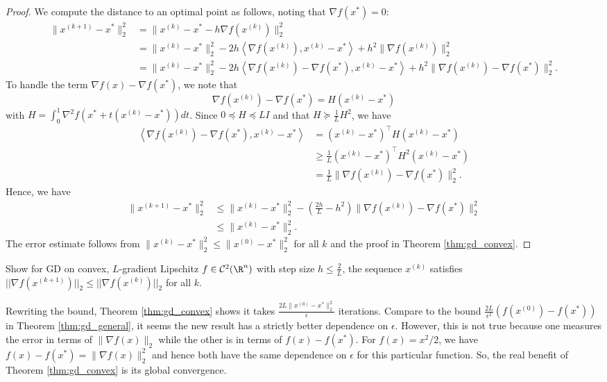 \begin{proof}
We compute the distance to an optimal point as follows, noting that
$\nabla f(x^{*})=0$:
\begin{align*}
\|x^{(k+1)}-x^{*}\|_{2}^{2} & =\|x^{(k)}-x^{*}-h\nabla f(x^{(k)})\|_{2}^{2}\\
 & =\|x^{(k)}-x^{*}\|_{2}^{2}-2h\left\langle \nabla f(x^{(k)}),x^{(k)}-x^{*}\right\rangle +h^{2}\|\nabla f(x^{(k)})\|_{2}^{2}\\
 & =\|x^{(k)}-x^{*}\|_{2}^{2}-2h\left\langle \nabla f(x^{(k)})-\nabla f(x^{*}),x^{(k)}-x^{*}\right\rangle +h^{2}\|\nabla f(x^{(k)})-\nabla f(x^{*})\|_{2}^{2}.
\end{align*}
To handle the term $\nabla f(x)-\nabla f(x^{*})$, we note that
\[
\nabla f(x^{(k)})-\nabla f(x^{*})=H(x^{(k)}-x^{*})
\]
with $H=\int_{0}^{1}\nabla^{2}f(x^{*}+t(x^{(k)}-x^{*}))dt$. Since
$0\preceq H\preceq LI$ and that $H\succeq\frac{1}{L}H^{2}$, we have
\begin{align*}
\left\langle \nabla f(x^{(k)})-\nabla f(x^{*}),x^{(k)}-x^{*}\right\rangle  & =(x^{(k)}-x^{*})^{\top}H(x^{(k)}-x^{*})\\
 & \geq\frac{1}{L}(x^{(k)}-x^{*})^{\top}H^{2}(x^{(k)}-x^{*})\\
 & =\frac{1}{L}\|\nabla f(x^{(k)})-\nabla f(x^{*})\|_{2}^{2}.
\end{align*}
Hence, we have
\begin{align*}
\|x^{(k+1)}-x^{*}\|_{2}^{2} & \leq\|x^{(k)}-x^{*}\|_{2}^{2}-(\frac{2h}{L}-h^{2})\|\nabla f(x^{(k)})-\nabla f(x^{*})\|_{2}^{2}\\
 & \leq\|x^{(k)}-x^{*}\|_{2}^{2}.
\end{align*}
The error estimate follows from $\|x^{(k)}-x^{*}\|_{2}^{2}\leq\|x^{(0)}-x^{*}\|_{2}^{2}$
for all $k$ and the proof in Theorem \ref{thm:gd_convex}.
\end{proof}
\begin{xca}
Show for GD on convex, $L$-gradient Lipschitz $f\in\mathcal{C}^{2}(\R^{n})$
with step size $h\leq\frac{2}{L}$, the sequence $x^{(k)}$ satisfies
$||\nabla f(x^{(k+1)})||_{2}\leq||\nabla f(x^{(k)})||_{2}$ for all
$k$. 
\end{xca}

Rewriting the bound, Theorem \ref{thm:gd_convex} shows it takes $\frac{2L\|x^{(0)}-x^{*}\|_{2}^{2}}{\epsilon}$
iterations. Compare to the bound $\frac{2L}{\epsilon^{2}}\left(f(x^{(0)})-f(x^{*})\right)$
in Theorem \ref{thm:gd_general}, it seems the new result has a strictly
better dependence on $\epsilon$. However, this is not true because
one measures the error in terms of $\|\nabla f(x)\|_{2}$ while the
other is in terms of $f(x)-f(x^{*})$. For $f(x)=x^{2}/2$, we have
$f(x)-f(x^{*})=\|\nabla f(x)\|_{2}^{2}$ and hence both have the same
dependence on $\epsilon$ for this particular function. So, the real
benefit of Theorem \ref{thm:gd_convex} is its global convergence.

